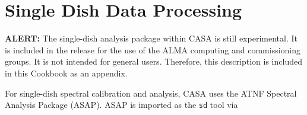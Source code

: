 

\chapter[Appendix: Single Dish Data Processing]{Single Dish Data Processing}
\label{chapter:sd}


{\bf ALERT:} The single-dish analysis package within CASA
is still experimental.
It is included in the release for the use
of the ALMA computing and commissioning groups.  It is not intended
for general users.  Therefore, this description is included in this Cookbook
as an appendix.  

For single-dish spectral calibration and analysis, 
CASA uses the ATNF Spectral Analysis Package (ASAP).
ASAP is
imported as the {\tt sd} tool via \\


\\

